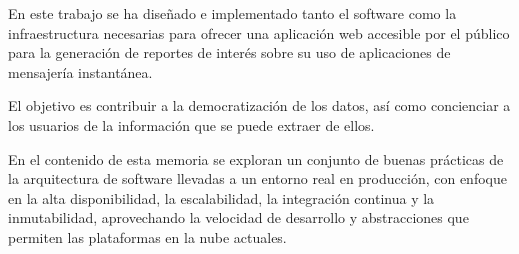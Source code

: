 
En este trabajo se ha diseñado e implementado tanto el software como la infraestructura necesarias para ofrecer una aplicación web accesible por el público para la generación de reportes de interés sobre su uso de aplicaciones de mensajería instantánea.

El objetivo es contribuir a la democratización de los datos, así como concienciar a los usuarios de la información que se puede extraer de ellos.

En el contenido de esta memoria se exploran un conjunto de buenas prácticas de la arquitectura de software llevadas a un entorno real en producción, con enfoque en la alta disponibilidad, la escalabilidad, la integración continua y la inmutabilidad, aprovechando la velocidad de desarrollo y abstracciones que permiten las plataformas en la nube actuales.

